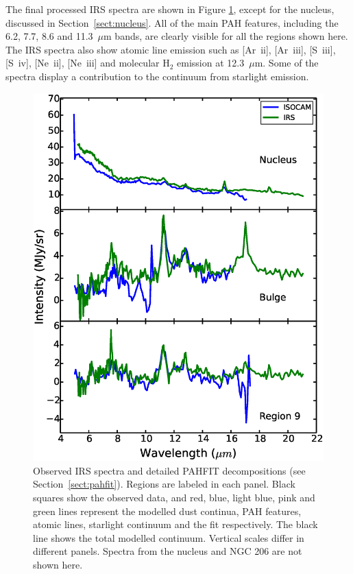 
The final processed IRS spectra are shown in  Figure \ref{PAHFITplots}, except for the nucleus, discussed in Section~\ref{sect:nucleus}.
All of the main PAH features, including the 6.2, 7.7, 8.6 and 11.3~$\mu$m bands, 
are clearly visible for all the regions shown here.
The IRS spectra also show atomic line emission such as [Ar~{\sc ii}], [Ar~{\sc iii}], [S~{\sc iii}], [S~{\sc iv}], [Ne~{\sc ii}], [Ne~{\sc iii}] 
and molecular H$_{2}$ emission at 12.3~$\mu$m. Some of the spectra display a contribution to the continuum from starlight emission.


\begin{figure}
\centering
\includegraphics[scale=0.45]{./fig6.eps}
 \caption{Observed IRS spectra and detailed PAHFIT decompositions (see Section~\ref{sect:pahfit}). Regions are labeled in each panel.
Black squares show the observed data, and red, blue, light blue, pink and green lines represent the modelled
dust continua, PAH features, atomic lines, starlight continuum and the fit respectively. The black line shows the total modelled continuum. 
Vertical scales differ in different panels. Spectra from the nucleus and NGC 206 are not shown here.
}
\label{PAHFITplots}
\end{figure}


